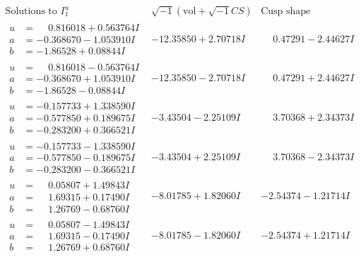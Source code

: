 \documentclass[1p]{elsarticle_modified}
\theoremstyle{definition}
\newcommand{\I}{\sqrt{-1}}
\begin{document}
$$\begin{array}{c|c|c}  
\text{Solutions to }I^u_{1}& \I (\text{vol} + \sqrt{-1}CS) & \text{Cusp shape}\\
 \hline 
\begin{aligned}
u &= \phantom{-}0.816018 + 0.563764 I \\
a &= -0.368670 - 1.053910 I \\
b &= -1.86528 + 0.08844 I\end{aligned}
 & -12.35850 + 2.70718 I & \phantom{-}0.47291 - 2.44627 I \\ \hline\begin{aligned}
u &= \phantom{-}0.816018 - 0.563764 I \\
a &= -0.368670 + 1.053910 I \\
b &= -1.86528 - 0.08844 I\end{aligned}
 & -12.35850 - 2.70718 I & \phantom{-}0.47291 + 2.44627 I \\ \hline\begin{aligned}
u &= -0.157733 + 1.338590 I \\
a &= -0.577850 + 0.189675 I \\
b &= -0.283200 + 0.366521 I\end{aligned}
 & -3.43504 - 2.25109 I & \phantom{-}3.70368 + 2.34373 I \\ \hline\begin{aligned}
u &= -0.157733 - 1.338590 I \\
a &= -0.577850 - 0.189675 I \\
b &= -0.283200 - 0.366521 I\end{aligned}
 & -3.43504 + 2.25109 I & \phantom{-}3.70368 - 2.34373 I \\ \hline\begin{aligned}
u &= \phantom{-}0.05807 + 1.49843 I \\
a &= \phantom{-}1.69315 + 0.17490 I \\
b &= \phantom{-}1.26769 - 0.68760 I\end{aligned}
 & -8.01785 + 1.82060 I & -2.54374 - 1.21714 I \\ \hline\begin{aligned}
u &= \phantom{-}0.05807 - 1.49843 I \\
a &= \phantom{-}1.69315 - 0.17490 I \\
b &= \phantom{-}1.26769 + 0.68760 I\end{aligned}
 & -8.01785 - 1.82060 I & -2.54374 + 1.21714 I \\ \hline\begin{aligned}

\end{aligned}
\end{array}$$
\end{document}
